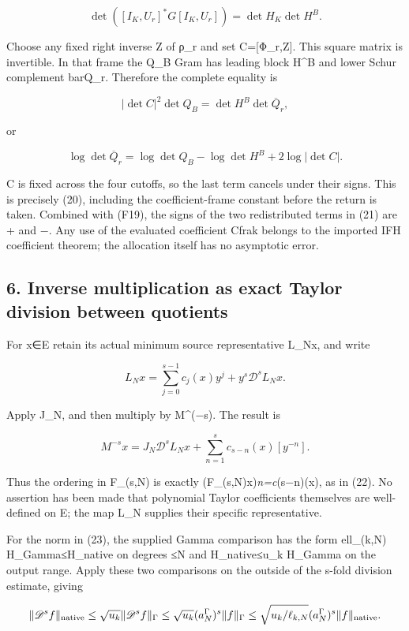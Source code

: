 \documentclass[11pt]{article}
\begin{document}
\[
\det([I_K,U_r]^*G[I_K,U_r])=\det H_K\det H^B. \tag{F19}
\]

Choose any fixed right inverse Z of ρ\_r and set C={[}Φ\_r,Z{]}. This square matrix is invertible. In that frame the Q\_B Gram has leading block H\^{}B and lower Schur complement barQ\_r. Therefore the complete equality is

\[
|\det C|^2\det Q_B=\det H^B\det\overline Q_r,
\]

or

\[
\log\det\overline Q_r
=\log\det Q_B-\log\det H^B+2\log|\det C|. \tag{F20}
\]

C is fixed across the four cutoffs, so the last term cancels under their signs. This is precisely (20), including the coefficient-frame constant before the return is taken. Combined with (F19), the signs of the two redistributed terms in (21) are + and −. Any use of the evaluated coefficient Cfrak belongs to the imported IFH coefficient theorem; the allocation itself has no asymptotic error.

\subsection{6. Inverse multiplication as exact Taylor division between quotients}\label{inverse-multiplication-as-exact-taylor-division-between-quotients}

For x∈E retain its actual minimum source representative L\_Nx, and write

\[
L_Nx=\sum_{j=0}^{s-1}c_j(x)y^j+y^s\mathscr D^sL_Nx.
\]

Apply J\_N, and then multiply by M\^{}(−s). The result is

\[
M^{-s}x=J_N\mathscr D^sL_Nx+
\sum_{n=1}^sc_{s-n}(x)[y^{-n}]. \tag{F22}
\]

Thus the ordering in F\_(s,N) is exactly (F\_(s,N)x)\emph{n=c}(s−n)(x), as in (22). No assertion has been made that polynomial Taylor coefficients themselves are well-defined on E; the map L\_N supplies their specific representative.

For the norm in (23), the supplied Gamma comparison has the form ell\_(k,N) H\_Gamma≤H\_native on degrees ≤N and H\_native≤u\_k H\_Gamma on the output range. Apply these two comparisons on the outside of the s-fold division estimate, giving

\[
\|\mathscr D^sf\|_{\rm native}
\le \sqrt{u_k}\|\mathscr D^sf\|_\Gamma
\le\sqrt{u_k}(a_N^\Gamma)^s\|f\|_\Gamma
\le\sqrt{u_k/\ell_{k,N}}(a_N^\Gamma)^s\|f\|_{\rm native}.
\]
\end{document}
